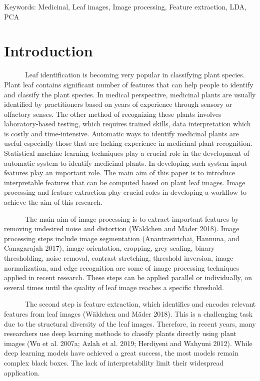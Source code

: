 \documentclass{article}
\begin{document}

Keywords: Medicinal, Leaf images, Image processing, Feature extraction,
LDA, PCA

\hypertarget{introduction}{%
\section{Introduction}\label{introduction}}

~~~~~~Leaf identification is becoming very popular in classifying plant
species. Plant leaf contains significant number of features that can
help people to identify and classify the plant species. In medical
perspective, medicinal plants are usually identified by practitioners
based on years of experience through sensory or olfactory senses. The
other method of recognizing these plants involves laboratory-based
testing, which requires trained skills, data interpretation which is
costly and time-intensive. Automatic ways to identify medicinal plants
are useful especially those that are lacking experience in medicinal
plant recognition. Statistical machine learning techniques play a
crucial role in the development of automatic system to identify
medicinal plants. In developing such system input features play an
important role. The main aim of this paper is to introduce interpretable
features that can be computed based on plant leaf images. Image
processing and feature extraction play crucial roles in developing a
workflow to achieve the aim of this research.

~~~~~~The main aim of image processing is to extract important features
by removing undesired noise and distortion (Wäldchen and Mäder 2018).
Image processing steps include image segmentation (Anantrasirichai,
Hannuna, and Canagarajah 2017), image orientation, cropping, grey
scaling, binary thresholding, noise removal, contrast stretching,
threshold inversion, image normalization, and edge recognition are some
of image processing techniques applied in recent research. These steps
can be applied parallel or individually, on several times until the
quality of leaf image reaches a specific threshold.

~~~~~~The second step is feature extraction, which identifies and
encodes relevant features from leaf images (Wäldchen and Mäder 2018).
This is a challenging task due to the structural diversity of the leaf
images. Therefore, in recent years, many researchers use deep learning
methods to classify plants directly using plant images (Wu et al. 2007a;
Azlah et al. 2019; Herdiyeni and Wahyuni 2012). While deep learning
models have achieved a great success, the most models remain complex
black boxes. The lack of interpretability limit their widespread
application.
\end{document}
